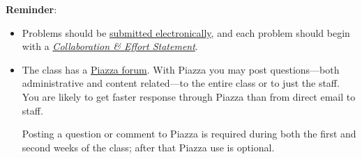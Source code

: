 \documentclass[handout]{mcs}
\begin{document}
\renewcommand{\reading}{ \iffalse
  Part~\bref{part:proofs}{. \emph{Proofs: Introduction}};\fi
\begin{itemize}
\item Chapter~\bref{proofs_chap}{.\ \emph{What is a Proof?}},

\item  Chapter~\bref{well_ordering_chap}{.\ \emph{The Well Ordering
      Principle}} through~\bref{factor_sec}{.\ \emph{Factoring into Primes}}
  (omit~\bref{well_ordering_sec}{.\ \emph{Well Ordered Sets}}),

\item  Chapter~\bref{logicform_chap}{.\ \emph{Logical
      Formulas}} through~\bref{equiv_valid_sec}{.\ \emph{Equivalence and
      Validity}}, and~\bref{SAT_sec}{.\ \emph{The SAT Problem}}\\
  (optional:~\bref{prop_algebra_sec}{.\ \emph{Algebra of
      Propositions}}).
\end{itemize}
These assigned readings do \textbf{not}
  include the Problem sections.  (Many of the problems in the text
  will appear as class or homework problems.)}


\medskip

\textbf{Reminder}:

\begin{itemize}

\item Problems should be
  \href{https://stellar.mit.edu/S/course/6/sp15/6.042/homework/index.html}
       {submitted electronically}, and each problem should begin with a \href{https://stellar.mit.edu/S/course/6/sp15/6.042/courseMaterial/topics/topic4/syllabus/text3/text}{
\emph{Collaboration \& Effort Statement}}.
\iffalse
\href{http://courses.csail.mit.edu/6.042/spring15/submission.shtml#collab-state}
{\emph{collaboration statement}}
\fi

\item The class has a
  \href{http://piazza.com/mit/spring2015/6042j18062j/home} {Piazza
    forum}.  With Piazza you may post questions---both administrative
  and content related---to the entire class or to just the staff.  You
  are likely to get faster response through Piazza than from direct
  email to staff.

Posting a question or comment to Piazza is required during both the
first and second weeks of the class; after that Piazza use is
optional.
\end{itemize}
\end{document}
